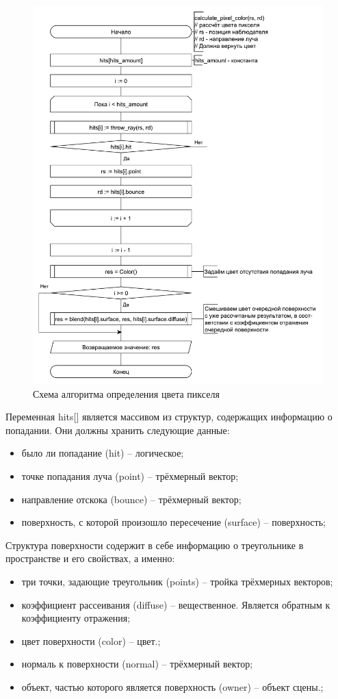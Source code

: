 \documentclass[a4paper, 14pt]{report} %
\begin{document}
	\begin{figure}[!ht]
		\centering
		\includegraphics[width=1\linewidth]{calculate_pixel_color}
		\caption{Схема алгоритма определения цвета пикселя}
		\label{fig:calculate_pixel_color}
	\end{figure}

	Переменная hits[] является массивом из структур, содержащих информацию о попадании. Они должны хранить следующие данные:
	\begin{itemize}
		\item было ли попадание (hit) – логическое;
		\item точке попадания луча (point) – трёхмерный вектор;
		\item направление отскока (bounce) – трёхмерный вектор;
		\item поверхность, с которой произошло пересечение (surface) – поверхность;
	\end{itemize}

	Структура поверхности содержит в себе информацию о треугольнике в пространстве и его свойствах, а именно:
	\begin{itemize}
		\item три точки, задающие треугольник (points) – тройка трёхмерных векторов;
		\item коэффициент рассеивания (diffuse) – вещественное. Является обратным к коэффициенту отражения;
		\item цвет поверхности (color) – цвет.;
		\item нормаль к поверхности (normal) – трёхмерный вектор;
		\item объект, частью которого является поверхность (owner) – объект сцены.;
	\end{itemize}
	
\end{document}

